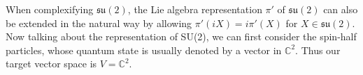 \documentclass[11pt, onesided]{book}
\theoremstyle{break}
\theoremstyle{break}
\newcommand{\C}{\mathbb{C}}
\begin{document}
When complexifying $\mathfrak{su}(2)$, the Lie algebra representation $\pi'$ of $\mathfrak{su}(2)$ can also be extended in the natural way by allowing $\pi'(iX) = i\pi'(X)$ for $X \in \mathfrak{su}(2)$. \\




Now talking about the representation of SU(2), we can first consider the spin-half particles, whose quantum state is usually denoted by a vector in $\C^2$. Thus our target vector space is $V = \C^2$.
\end{document}
